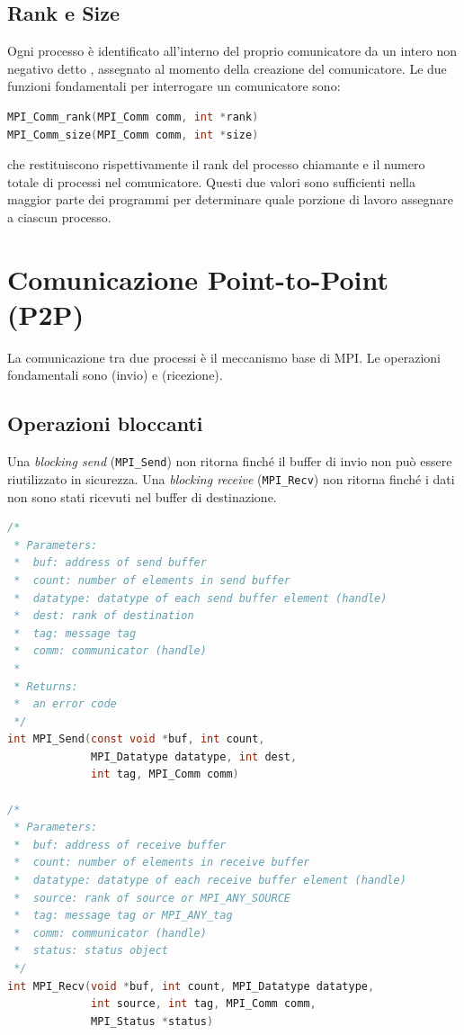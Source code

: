 \subsection{Rank e Size}
Ogni processo è identificato all'interno del proprio comunicatore da un intero non negativo detto , assegnato al momento della creazione del comunicatore. Le due funzioni fondamentali per interrogare un comunicatore sono:
\begin{lstlisting}[language=C, numbers=none]
MPI_Comm_rank(MPI_Comm comm, int *rank)
MPI_Comm_size(MPI_Comm comm, int *size)
\end{lstlisting}
che restituiscono rispettivamente il rank del processo chiamante e il numero totale di processi nel comunicatore. Questi due valori sono sufficienti nella maggior parte dei programmi per determinare quale porzione di lavoro assegnare a ciascun processo.

\section{Comunicazione Point-to-Point (P2P)} 
La comunicazione tra due processi è il meccanismo base di MPI. Le operazioni fondamentali sono  (invio) e  (ricezione). 

\subsection{Operazioni bloccanti}
Una \textit{blocking send} (\texttt{MPI\_Send}) non ritorna finché il buffer di invio non può essere riutilizzato in sicurezza. Una \textit{blocking receive} (\texttt{MPI\_Recv}) non ritorna finché i dati non sono stati ricevuti nel buffer di destinazione.

\begin{lstlisting}[language=C, numbers=none]
/*
 * Parameters:
 *  buf: address of send buffer
 *  count: number of elements in send buffer
 *  datatype: datatype of each send buffer element (handle)
 *  dest: rank of destination
 *  tag: message tag
 *  comm: communicator (handle)
 * 
 * Returns:
 *  an error code
 */
int MPI_Send(const void *buf, int count,
             MPI_Datatype datatype, int dest,
             int tag, MPI_Comm comm)

/*
 * Parameters:
 *  buf: address of receive buffer
 *  count: number of elements in receive buffer
 *  datatype: datatype of each receive buffer element (handle)
 *  source: rank of source or MPI_ANY_SOURCE
 *  tag: message tag or MPI_ANY_tag
 *  comm: communicator (handle)
 *  status: status object
 */
int MPI_Recv(void *buf, int count, MPI_Datatype datatype,
             int source, int tag, MPI_Comm comm,
             MPI_Status *status)
\end{lstlisting}

